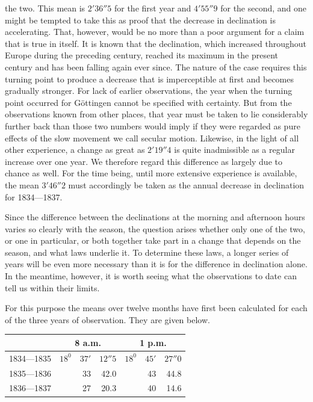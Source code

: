 the two. This mean is $2'36''5$ for the first year and $4'55''9$ for the second, and one might be tempted to take this as proof that the decrease in declination is accelerating. That, however, would be no more than a poor argument for a claim that is true in itself. It is known that the declination, which increased throughout Europe during the preceding century, reached its maximum in the present century and has been falling again ever since. The nature of the case requires this turning point to produce a decrease that is imperceptible at first and becomes gradually stronger. For lack of earlier observations, the year when the turning point occurred for Göttingen cannot be specified with certainty. But from the observations known from other places, that year must be taken to lie considerably further back than those two numbers would imply if they were regarded as pure effects of the slow movement we call secular motion. Likewise, in the light of all other experience, a change as great as $2'19''4$ is quite inadmissible as a regular increase over one year. We therefore regard this difference as largely due to chance as well. For the time being, until more extensive experience is available, the mean $3'46''2$ must accordingly be taken as the annual decrease in declination for 1834---1837.

Since the difference between the declinations at the morning and afternoon hours varies so clearly with the season, the question arises whether only one of the two, or one in particular, or both together take part in a change that depends on the season, and what laws underlie it. To determine these laws, a longer series of years will be even more necessary than it is for the difference in declination alone. In the meantime, however, it is worth seeing what the observations to date can tell us within their limits.

For this purpose the means over twelve months have first been calculated for each of the three years of observation. They are given below.
\begin{center}\small
\begin{tabular}{l|rrr|rrr}
&\multicolumn{3}{c|}{8 a.m.}&\multicolumn{3}{c}{1 p.m.}\\\hline
1834---1835&$18^0$&$37'$&$12''5$&$18^0$&$45'$&$27''0$\\
1835---1836&&33&42.0&&43&44.8\\
1836---1837&&27&20.3&&40&14.6
\end{tabular}
\end{center}

